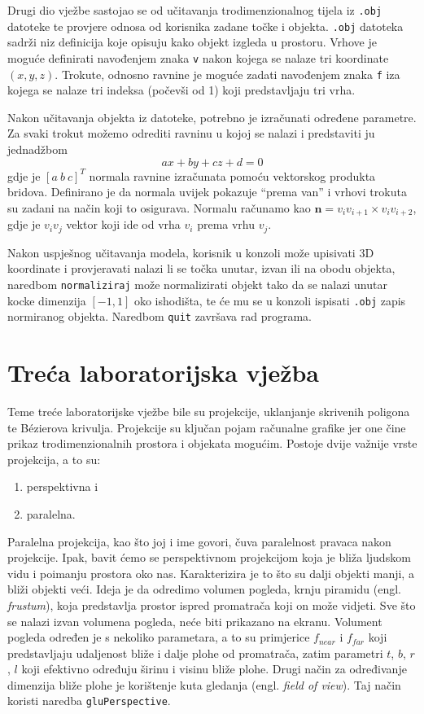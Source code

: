 \documentclass[a4paper,12pt]{article}
\begin{document}
Drugi dio vježbe sastojao se od učitavanja trodimenzionalnog tijela iz {\tt .obj} datoteke te
provjere odnosa od korisnika zadane točke i objekta. {\tt .obj} datoteka sadrži niz definicija
koje opisuju kako objekt izgleda u prostoru. Vrhove je moguće definirati navođenjem znaka {\tt v}
nakon kojega se nalaze tri koordinate $(x, y, z)$. Trokute, odnosno ravnine je moguće zadati
navođenjem znaka {\tt f} iza kojega se nalaze tri indeksa (počevši od 1) koji predstavljaju tri vrha.

Nakon učitavanja objekta iz datoteke, potrebno je izračunati određene parametre. Za svaki trokut
možemo odrediti ravninu u kojoj se nalazi i predstaviti ju jednadžbom
\[
ax + by + cz + d = 0
\]
gdje je $[a\ b\ c]^T$ normala ravnine izračunata pomoću vektorskog produkta bridova. Definirano je
da normala uvijek pokazuje ``prema van'' i vrhovi trokuta su zadani na način koji to osigurava.
Normalu računamo kao $\mathbf{n} = v_{i}v_{i+1} \times v_{i}v_{i+2}$, gdje je $v_iv_j$ vektor koji
ide od vrha $v_i$ prema vrhu $v_j$.

Nakon uspješnog učitavanja modela, korisnik u konzoli može upisivati 3D
koordinate i provjeravati nalazi li se točka unutar, izvan ili na obodu objekta,
naredbom {\tt normaliziraj} može normalizirati objekt tako da se nalazi
unutar kocke dimenzija $[-1, 1]$ oko ishodišta, te će mu se u konzoli ispisati
{\tt .obj} zapis normiranog objekta.
Naredbom {\tt quit} završava rad programa.

\section{Treća laboratorijska vježba}

Teme treće laboratorijske vježbe bile su projekcije, uklanjanje skrivenih poligona te B{\'e}zierova krivulja. Projekcije
su ključan pojam računalne grafike jer one čine prikaz trodimenzionalnih prostora i objekata
mogućim. Postoje dvije važnije vrste projekcija, a to su:
\begin{enumerate}
  \item perspektivna i
  \item paralelna.
\end{enumerate}

Paralelna projekcija, kao što joj i ime govori, čuva paralelnost pravaca nakon projekcije. Ipak,
bavit ćemo se perspektivnom projekcijom koja je bliža ljudskom vidu i poimanju prostora oko nas.
Karakterizira je to što su dalji objekti manji, a bliži objekti veći.
Ideja je da odredimo volumen pogleda, krnju piramidu (engl. {\sl frustum}), koja predstavlja
prostor ispred promatrača koji on može vidjeti. Sve što se nalazi izvan volumena pogleda, neće biti
prikazano na ekranu. Volument pogleda određen je s nekoliko parametara, a to su primjerice
$f_{near}$ i $f_{far}$ koji predstavljaju udaljenost bliže i dalje plohe od promatrača, zatim
parametri $t$, $b$, $r$, $l$ koji efektivno određuju širinu i visinu bliže plohe. Drugi način za
određivanje dimenzija bliže plohe je korištenje kuta gledanja (engl. {\sl field of view}).
Taj način koristi naredba {\verb|gluPerspective|}.
\end{document}
